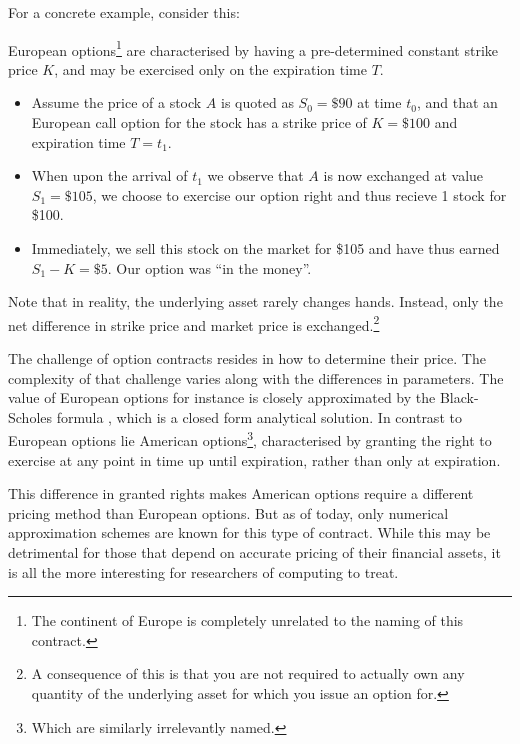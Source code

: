 For a concrete example, consider this:
\begin{example}
  European options\footnote{The continent of Europe is completely unrelated to
  the naming of this contract.} are characterised by having a pre-determined
  constant strike price $K$, and may be exercised only on the expiration time
  $T$.

  \begin{itemize}
  \item Assume the price of a stock $A$ is quoted as $S_0=\$90$ at time
    $t_0$, and that an European call option for the stock has a strike
    price of $K=\$100$ and expiration time $T=t_1$.


  \item When upon the arrival of $t_1$ we observe that $A$ is now
    exchanged at value $S_1=\$105$, we choose to exercise our option right
    and thus recieve 1 stock for \$100.

    \item Immediately, we sell this stock on the market for \$105 and have thus
      earned $S_1-K=\$5$. Our option was ``in the money''.
  \end{itemize}

  Note that in reality, the underlying asset rarely changes hands. Instead,
  only the net difference in strike price and market price is
  exchanged.\footnote{A consequence of this is that you are not required to
  actually own any quantity of the underlying asset for which you issue an
  option for.}
\end{example}

The challenge of option contracts resides in how to determine their
price. The complexity of that challenge varies along with the
differences in parameters.  The value of European options for instance
is closely approximated by the Black-Scholes formula
\cite{black1973pricing}, which is a closed form analytical solution.
In contrast to European options lie American options\footnote{Which
  are similarly irrelevantly named.}, characterised by granting the
right to exercise at any point in time up until expiration, rather
than only at expiration.

This difference in granted rights makes American options require a different
pricing method than European options. But as of today, only numerical
approximation schemes are known for this type of contract. While this may be
detrimental for those that depend on accurate pricing of their financial
assets, it is all the more interesting for researchers of computing to treat.


